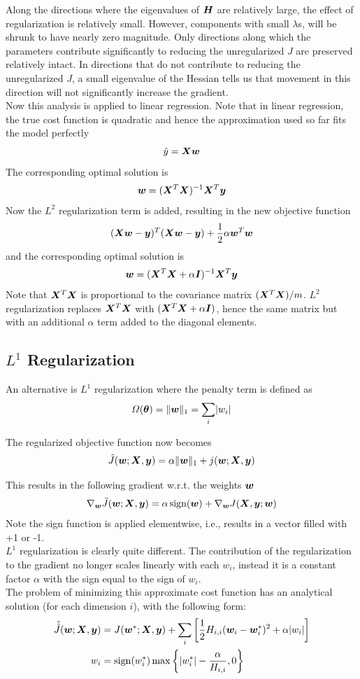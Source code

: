 \begin{multicols}{2}
	Along the directions where the eigenvalues of ${\bm{H}}$ are relatively large, the effect of regularization is relatively small.
	However, components with small $\lambda$s, will be shrunk to have nearly zero magnitude.
	Only directions along which the parameters contribute significantly to reducing the unregularized $J$ are preserved relatively intact. In directions that do not contribute to reducing the unregularized $J$, a small eigenvalue of the Hessian tells us that movement in this direction will not significantly increase the gradient.\\

	Now this analysis is applied to linear regression.
	Note that in linear regression, the true cost function is quadratic and hence the approximation used so far fits the model perfectly
	\[ \hat{y} = {\bm{X}}{\bm{w}} \]
	The corresponding optimal solution is
	\[ {\bm{w}} = ({\bm{X}}^T{\bm{X}})^{-1}{\bm{X}}^T{\bm{y}} \]
	Now the $L^2$ regularization term is added, resulting in the new objective function
	\[ ({\bm{X}}{\bm{w}}-{\bm{y}})^T({\bm{X}}{\bm{w}}-{\bm{y}})+\frac{1}{2}\alpha{\bm{w}}^T{\bm{w}} \]
	and the corresponding optimal solution is
	\[ {\bm{w}} = ({\bm{X}}^T{\bm{X}}+\alpha{\bm{I}})^{-1}{\bm{X}}^T{\bm{y}} \]
	Note that ${\bm{X}}^T{\bm{X}}$ is proportional to the covariance matrix $({\bm{X}}^T{\bm{X}})/m$.
	$L^2$ regularization replaces ${\bm{X}}^T{\bm{X}}$ with $({\bm{X}}^T{\bm{X}}+\alpha{\bm{I}})$, hence the same matrix but with an additional $\alpha$ term added to the diagonal elements.

	\subsection{$L^1$ Regularization}
	An alternative is $L^1$ regularization where the penalty term is defined as
	\[ \Omega(\bolt) = \lVert\vw\rVert_1 = \sum_i \lvert w_i\rvert \]

	The regularized objective function now becomes
	\[ \tilde{J}({\bm{w}};{\bm{X}},{\bm{y}}) = \alpha\lVert{\bm{w}}\rVert_1+j({\bm{w}};{\bm{X}},{\bm{y}}) \]

	This results in the following gradient w.r.t. the weights ${\bm{w}}$
	\[ \nabla_{\bm{w}} \tilde{J}({\bm{w}};{\bm{X}},{\bm{y}})=\alpha \operatorname{sign}({\bm{w}})+\nabla_{\bm{w}} J({\bm{X}},{\bm{y}};{\bm{w}}) \]
	Note the sign function is applied elementwise, i.e., results in a vector filled with +1 or -1.\\
	$L^1$ regularization is clearly quite different. The contribution of the regularization to the gradient no longer scales linearly with each $w_i$, instead it is a constant factor $\alpha$ with the sign equal to the sign of $w_i$.\\

	The problem of minimizing this approximate cost function has an analytical solution (for each dimension $i$), with the following form:
	\begin{align*}
	\tilde{\hat{J}}({\bm{w}};{\bm{X}},{\bm{y}})
	&= J({\bm{w}}^\ast;{\bm{X}},{\bm{y}})+\sum_i\left[\frac{1}{2} H_{i,i}({\bm{w}}_i-{\bm{w}}_i^\ast)^2+\alpha\lvert w_i\rvert\right]\\
	w_i &= \operatorname{sign}(w_i^\ast)\max\left\{ \lvert w_i^\ast\rvert-\frac{\alpha}{H_{i,i}},0 \right\}
	\end{align*}


\end{multicols}
